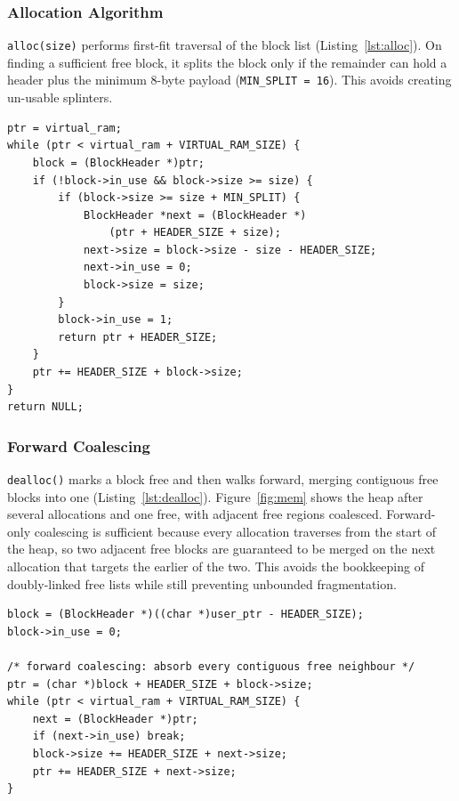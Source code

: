 \documentclass[conference]{IEEEtran}
\begin{document}
\subsubsection{Allocation Algorithm}
\texttt{alloc(size)} performs first-fit traversal of the block list (Listing~\ref{lst:alloc}). On finding a sufficient free block, it splits the block only if the remainder can hold a header plus the minimum 8-byte payload (\texttt{MIN\_SPLIT = 16}). This avoids creating un-usable splinters.

\begin{lstlisting}[caption={First-fit allocator with conditional splitting (excerpt from \texttt{src/lib/memory.c}).},label={lst:alloc}]
ptr = virtual_ram;
while (ptr < virtual_ram + VIRTUAL_RAM_SIZE) {
    block = (BlockHeader *)ptr;
    if (!block->in_use && block->size >= size) {
        if (block->size >= size + MIN_SPLIT) {
            BlockHeader *next = (BlockHeader *)
                (ptr + HEADER_SIZE + size);
            next->size = block->size - size - HEADER_SIZE;
            next->in_use = 0;
            block->size = size;
        }
        block->in_use = 1;
        return ptr + HEADER_SIZE;
    }
    ptr += HEADER_SIZE + block->size;
}
return NULL;
\end{lstlisting}

\subsubsection{Forward Coalescing}
\texttt{dealloc()} marks a block free and then walks forward, merging contiguous free blocks into one (Listing~\ref{lst:dealloc}). Figure~\ref{fig:mem} shows the heap after several allocations and one free, with adjacent free regions coalesced. Forward-only coalescing is sufficient because every allocation traverses from the start of the heap, so two adjacent free blocks are guaranteed to be merged on the next allocation that targets the earlier of the two. This avoids the bookkeeping of doubly-linked free lists while still preventing unbounded fragmentation.

\begin{lstlisting}[caption={Constant-time deallocation followed by greedy forward coalescing.},label={lst:dealloc}]
block = (BlockHeader *)((char *)user_ptr - HEADER_SIZE);
block->in_use = 0;

/* forward coalescing: absorb every contiguous free neighbour */
ptr = (char *)block + HEADER_SIZE + block->size;
while (ptr < virtual_ram + VIRTUAL_RAM_SIZE) {
    next = (BlockHeader *)ptr;
    if (next->in_use) break;
    block->size += HEADER_SIZE + next->size;
    ptr += HEADER_SIZE + next->size;
}
\end{lstlisting}
\end{document}
